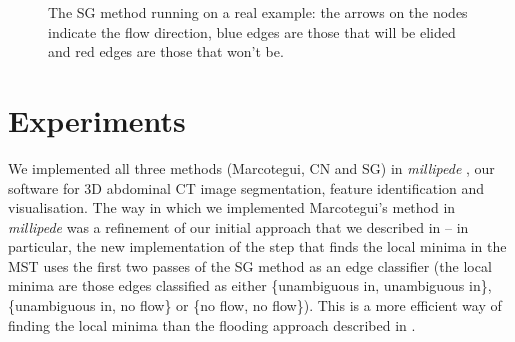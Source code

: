 \documentclass[a4paper]{article}
\newenvironment{stusubfig}[1]
{
	\begin{figure}[#1]
	\begin{center}
}
{
	\end{center}
	\end{figure}
}
\begin{document}
\begin{stusubfig}{p}
\caption[The SG method running on a real example]{The SG method running on a real example: the arrows on the nodes indicate the flow direction, blue edges are those that will be elided and red edges are those that won't be.}
\label{fig:segmentation-waterfall-smg-example}
\end{stusubfig}

\section{Experiments}
\label{sec:experiments}

We implemented all three methods (Marcotegui, CN and SG) in \emph{millipede} \cite{millipede}, our software for 3D abdominal CT image segmentation, feature identification and visualisation. The way in which we implemented Marcotegui's method in \emph{millipede} was a refinement of our initial approach that we described in \cite{golodetz08} -- in particular, the new implementation of the step that finds the local minima in the MST uses the first two passes of the SG method as an edge classifier (the local minima are those edges classified as either \{unambiguous in, unambiguous in\}, \{unambiguous in, no flow\} or \{no flow, no flow\}). This is a more efficient way of finding the local minima than the flooding approach described in \cite{golodetz08}.
\end{document}
